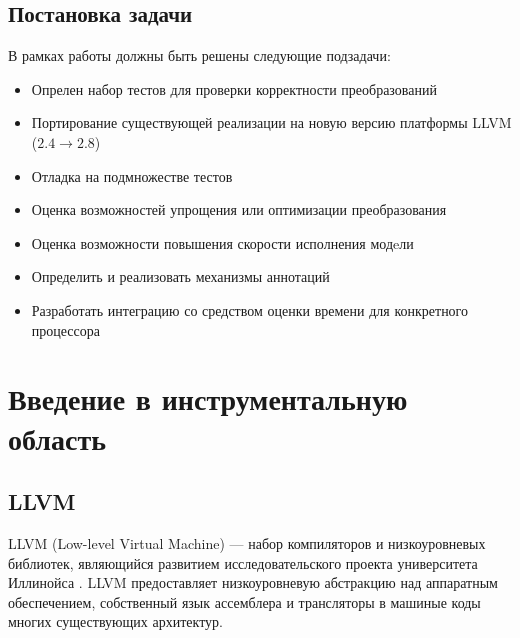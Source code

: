 \documentclass[12pt,a4paper]{article}
\begin{document}
\subsection{Постановка задачи}
В рамках работы должны быть решены следующие подзадачи:

\begin{itemize}
\item Опрелен набор тестов для проверки корректности преобразований
\item Портирование существующей реализации на новую версию платформы LLVM ($2.4 \to 2.8$)
\item Отладка на подмножестве тестов
\item Оценка возможностей упрощения или оптимизации преобразования
\item Оценка возможности повышения скорости исполнения модeли
\item Определить и реализовать механизмы аннотаций
\item Разработать интеграцию со средством оценки времени для конкретного процессора
\end{itemize}

\newpage

\section{Введение в инструментальную область}

\subsection{LLVM}
LLVM (Low-level Virtual Machine) --- набор компиляторов и низкоуровневых библиотек, являющийся развитием исследовательского проекта университета Иллинойса \cite{llvm}. LLVM предоставляет низкоуровневую абстракцию над аппаратным обеспечением, собственный язык ассемблера и трансляторы в машиные коды многих существующих архитектур.
\end{document}
